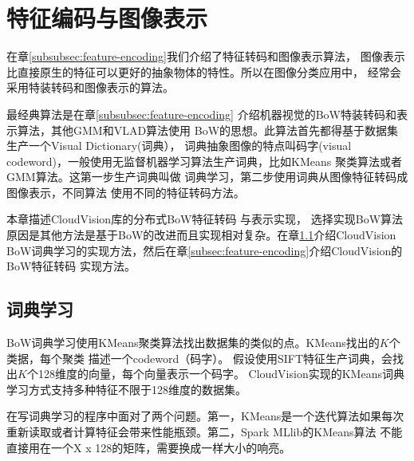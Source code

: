 \section{特征编码与图像表示}
\label{sec:image-representation}
在章\ref{subsubsec:feature-encoding}我们介绍了特征转码和图像表示算法，
图像表示比直接原生的特征可以更好的抽象物体的特性。所以在图像分类应用中，
经常会采用特装转码和图像表示的算法。

最经典算法是在章\ref{subsubsec:feature-encoding}
介绍机器视觉的BoW特装转码和表示算法，其他GMM和VLAD算法使用
BoW的思想。此算法首先都得基于数据集生产一个Visual Dictionary(词典），
词典抽象图像的特点叫码字(visual codeword)，一般使用无监督机器学习算法生产词典，比如KMeans
聚类算法或者GMM算法。这第一步生产词典叫做
词典学习，第二步使用词典从图像特征转码成图像表示，不同算法
使用不同的特征转码方法。

本章描述CloudVision库的分布式BoW特征转码
与表示实现，
选择实现BoW算法原因是其他方法是基于BoW的改进而且实现相对复杂。在章\ref{subsec:dict-learning}介绍CloudVision
BoW词典学习的实现方法，然后在章\ref{subsec:feature-encoding}介绍CloudVision的BoW特征转码
实现方法。

\subsection{词典学习}
\label{subsec:dict-learning}
BoW词典学习使用KMeans聚类算法找出数据集的类似的点。KMeans找出的$K$个类据，每个聚类
描述一个codeword（码字）。
假设使用SIFT特征生产词典，会找出$K$个128维度的向量，每个向量表示一个码字。
CloudVision实现的KMeans词典学习方式支持多种特征不限于128维度的数据集。

在写词典学习的程序中面对了两个问题。第一，KMeans是一个迭代算法如果每次
重新读取或者计算特征会带来性能瓶颈。第二，Spark MLlib的KMeans算法
不能直接用在一个X x 128的矩阵，需要换成一样大小的响亮。

